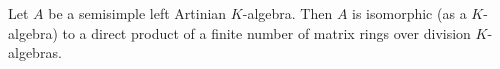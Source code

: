 Let $A$ be a semisimple left Artinian $K$-algebra. Then $A$ is isomorphic (as a $K$-algebra) to a direct product of a finite number of matrix rings over division $K$-algebras.
